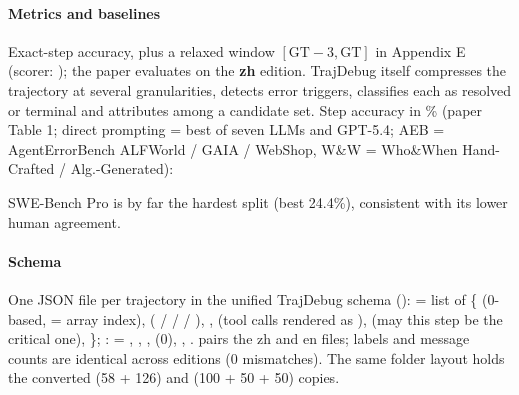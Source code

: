 \paragraph{Metrics and baselines} Exact-step accuracy, plus a relaxed window $[\mathrm{GT}{-}3, \mathrm{GT}]$ in Appendix E (scorer: ); the paper evaluates on the \textbf{zh} edition. TrajDebug itself compresses the trajectory at several granularities, detects error triggers, classifies each as resolved or terminal and attributes among a candidate set. Step accuracy in \% (paper Table 1; direct prompting = best of seven LLMs and GPT-5.4; AEB = AgentErrorBench ALFWorld / GAIA / WebShop, W\&W = Who\&When Hand-Crafted / Alg.-Generated):

\begin{center}\footnotesize\setlength{\tabcolsep}{2pt}
\end{center}
SWE-Bench Pro is by far the hardest split (best 24.4\%), consistent with its lower human agreement.

\paragraph{Schema} One JSON file per trajectory in the unified TrajDebug schema ():  = list of \{ (0-based, = array index),  ( /  /  / ), ,  (tool calls rendered as ),  (may this step be the critical one), \}; :  = , , ,  (0), , .  pairs the zh and en files; labels and message counts are identical across editions (0 mismatches). The same folder layout holds the converted  (58 + 126) and  (100 + 50 + 50) copies.

